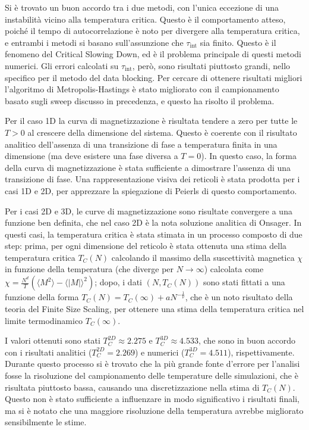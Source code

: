 \documentclass[11pt,a4paper]{article}
\begin{document}
Si è trovato un buon accordo tra i due metodi, con l'unica eccezione di una instabilità vicino alla temperatura critica. Questo è il comportamento atteso, poiché il tempo di autocorrelazione è noto per divergere alla temperatura critica, e entrambi i metodi si basano sull'assunzione che $\tau_{\text{int}}$ sia finito. Questo è il fenomeno del Critical Slowing Down, ed è il problema principale di questi metodi numerici. Gli errori calcolati su $\tau_{\text{int}}$, però, sono risultati piuttosto grandi, nello specifico per il metodo del data blocking. Per cercare di ottenere risultati migliori l'algoritmo di Metropolis-Hastings è stato migliorato con il campionamento basato sugli sweep discusso in precedenza, e questo ha risolto il problema.

Per il caso 1D la curva di magnetizzazione è risultata tendere a zero per tutte le $T > 0$ al crescere della dimensione del sistema. Questo è coerente con il risultato analitico dell'assenza di una transizione di fase a temperatura finita in una dimensione (ma deve esistere una fase diversa a $T = 0$). In questo caso, la forma della curva di magnetizzazione è stata sufficiente a dimostrare l'assenza di una transizione di fase. Una rappresentazione visiva dei reticoli è stata prodotta per i casi 1D e 2D, per apprezzare la spiegazione di Peierls di questo comportamento.

Per i casi 2D e 3D, le curve di magnetizzazione sono risultate convergere a una funzione ben definita, che nel caso 2D è la nota soluzione analitica di Onsager. In questi casi, la temperatura critica è stata stimata in un processo composto di due step: prima, per ogni dimensione del reticolo è stata ottenuta una stima della temperatura critica $T_C(N)$ calcolando il massimo della suscettività magnetica $\chi$ in funzione della temperatura (che diverge per $N \to \infty$) calcolata come $\chi = \frac{N^d}{T} \left( \langle M^2 \rangle - \langle |M| \rangle^2 \right)$; dopo, i dati $(N, T_C(N))$ sono stati fittati a una funzione della forma $T_C(N) = T_C(\infty) + aN^{-\frac{1}{\nu}}$, che è un noto risultato della teoria del Finite Size Scaling, per ottenere una stima della temperatura critica nel limite termodinamico $T_C(\infty)$.

I valori ottenuti sono stati $T_C^{2D} \approx 2.275$ e $T_C^{3D} \approx 4.533$, che sono in buon accordo con i risultati analitici ($T_C^{2D} = 2.269$) e numerici ($T_C^{3D} = 4.511$), rispettivamente. Durante questo processo si è trovato che la più grande fonte d'errore per l'analisi fosse la risoluzione del campionamento delle temperature delle simulazioni, che è risultata piuttosto bassa, causando una discretizzazione nella stima di $T_C(N)$. Questo non è stato sufficiente a influenzare in modo significativo i risultati finali, ma si è notato che una maggiore risoluzione della temperatura avrebbe migliorato sensibilmente le stime.
\end{document}
